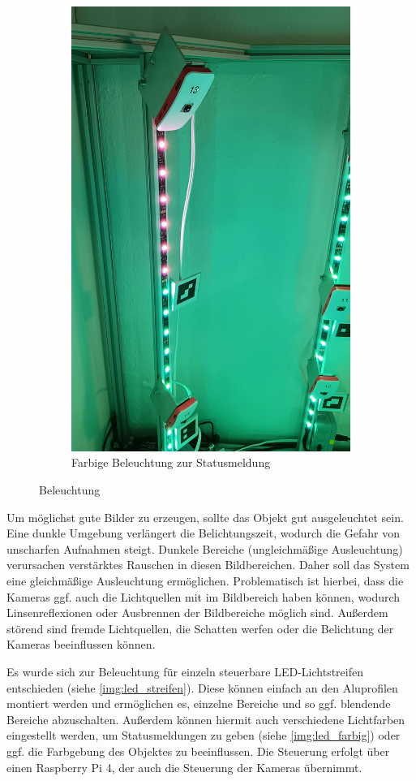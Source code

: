 \documentclass[./00PhotoBox.tex]{subfiles}
\begin{document}
\begin{figure}
\begin{subfigure}{0.45\textwidth}
        \includegraphics[height=1.2\linewidth]{./img/beleuchtung_farbig.jpg}
        \centering
        \caption{Farbige Beleuchtung zur Statusmeldung} %
        \label{img:led_farbig} %
    \end{subfigure}
    \caption{Beleuchtung} %
\end{figure}

Um möglichst gute Bilder zu erzeugen, sollte das Objekt gut ausgeleuchtet sein. Eine dunkle Umgebung verlängert die Belichtungszeit, wodurch die Gefahr von unscharfen Aufnahmen steigt. Dunkele Bereiche (ungleichmäßige Ausleuchtung) verursachen verstärktes Rauschen in diesen Bildbereichen. Daher soll das System eine gleichmäßige Ausleuchtung ermöglichen. Problematisch ist hierbei, dass die Kameras ggf. auch die Lichtquellen mit im Bildbereich haben können, wodurch Linsenreflexionen oder Ausbrennen der Bildbereiche möglich sind. Außerdem störend sind fremde Lichtquellen, die Schatten werfen oder die Belichtung der Kameras beeinflussen können.

Es wurde sich zur Beleuchtung für einzeln steuerbare LED-Lichtstreifen entschieden (siehe \autoref{img:led_streifen}). Diese können einfach an den Aluprofilen montiert werden und ermöglichen es, einzelne Bereiche und so ggf. blendende Bereiche abzuschalten. Außerdem können hiermit auch verschiedene Lichtfarben eingestellt werden, um Statusmeldungen zu geben (siehe \autoref{img:led_farbig}) oder ggf. die Farbgebung des Objektes zu beeinflussen. Die Steuerung erfolgt über einen Raspberry Pi 4, der auch die Steuerung der Kameras übernimmt.
\end{document}
